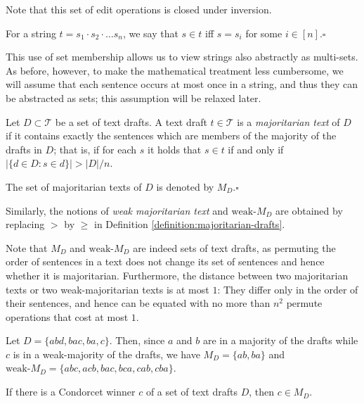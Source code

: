 \documentclass[sigconf]{aamas}  %
\newcommand{\qqed}{\hfill$\square$}
\newcommand{\calT}{\mathcal{T}}
\begin{document}
Note that this set of edit operations is closed under inversion.

\begin{definition}\label{definition:string-membership}
For a string $t = s_1\cdot s_2\cdot \ldots s_n$, we say that $s \in t$ iff $s = s_i$ for some $i \in [n]$.\qqed
\end{definition}

This use of set membership allows us to view strings also abstractly as multi-sets.  As before, however, to make the mathematical treatment less cumbersome, we will assume that each sentence occurs at most once in a string, and thus they can be abstracted as sets; this assumption will be relaxed later.

\begin{definition}\label{definition:majoritarian-drafts}
%
Let $D \subset \calT$ be a set of text drafts. A text draft $t \in \calT$ is a \emph{majoritarian text} of $D$ if it contains exactly the sentences which are members of the majority of the drafts in $D$; that is, if for each $s$ it holds that $s \in t$ if and only if $|\{d \in D : s \in d\}| > |D|/n$.

The set of majoritarian texts of $D$ is denoted by $M_D$.\qqed
%
\end{definition}

Similarly, the notions of \emph{weak majoritarian text} and $\textrm{weak-}M_D$ are obtained by replacing $>$  by $\ge$ in Definition \ref{definition:majoritarian-drafts}.

Note that $M_D$ and $\textrm{weak-}M_D$ are indeed sets of text drafts, as permuting  the order of sentences in a text does not change its set of sentences and hence whether it is majoritarian. Furthermore, the distance between two majoritarian texts or two weak-majoritarian texts is at most $1$: They differ only in the order of their sentences, and hence can be equated with no more than $n^2$ permute operations that cost at most $1$.

\begin{example}
%
Let $D = \{abd, bac, ba, c\}$. Then, since $a$ and $b$ are in a majority of the drafts while $c$ is in a weak-majority of the drafts, we have $M_D = \{ab, ba\}$ and $\textrm{weak-}M_D = \{abc, acb, bac, bca, cab, cba\}$.
%
\end{example}

\begin{lemma}\label{lemma:cinmd}
  If there is a Condorcet winner $c$ of a set of text drafts $D$, then $c \in M_D$.
\end{lemma}
\end{document}
